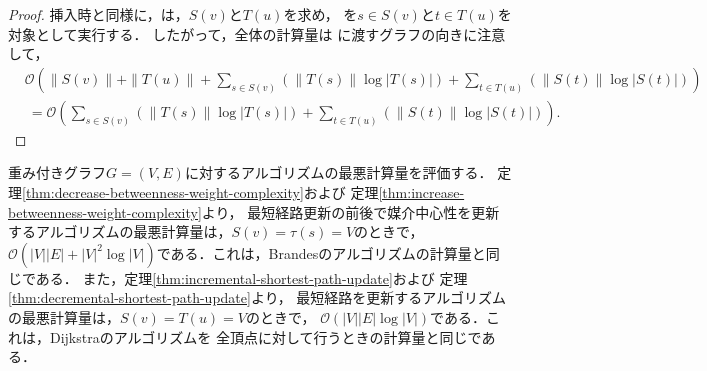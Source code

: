 \begin{proof}
  挿入時と同様に，は，$S(v)$と$T(u)$を求め，
  を$s\in S(v)$と$t\in T(u)$を対象として実行する．
  したがって，全体の計算量は
  に渡すグラフの向きに注意して，
  \begin{equation*}
    \begin{aligned}
      &\mathcal{O}(\|S(v)\|+\|T(u)\|+\sum_{s\in S(v)}(\|T(s)\|\log|T(s)|)+\sum_{t\in T(u)}(\|S(t)\|\log|S(t)|)) \\
      &\:=\mathcal{O}(\sum_{s\in S(v)}(\|T(s)\|\log|T(s)|)+\sum_{t\in T(u)}(\|S(t)\|\log|S(t)|)).
    \end{aligned}
  \end{equation*}
\end{proof}

重み付きグラフ$G=(V,E)$に対するアルゴリズムの最悪計算量を評価する．
定理\ref{thm:decrease-betweenness-weight-complexity}および
定理\ref{thm:increase-betweenness-weight-complexity}より，
最短経路更新の前後で媒介中心性を更新するアルゴリズムの最悪計算量は，$S(v)=\tau(s)=V$のときで，
$\mathcal{O}(|V||E|+|V|^2\log|V|)$である．これは，Brandesのアルゴリズムの計算量と同じである．
また，定理\ref{thm:incremental-shortest-path-update}および
定理\ref{thm:decremental-shortest-path-update}より，
最短経路を更新するアルゴリズムの最悪計算量は，$S(v)=T(u)=V$のときで，
$\mathcal{O}(|V||E|\log|V|)$である．これは，Dijkstraのアルゴリズムを
全頂点に対して行うときの計算量と同じである．
